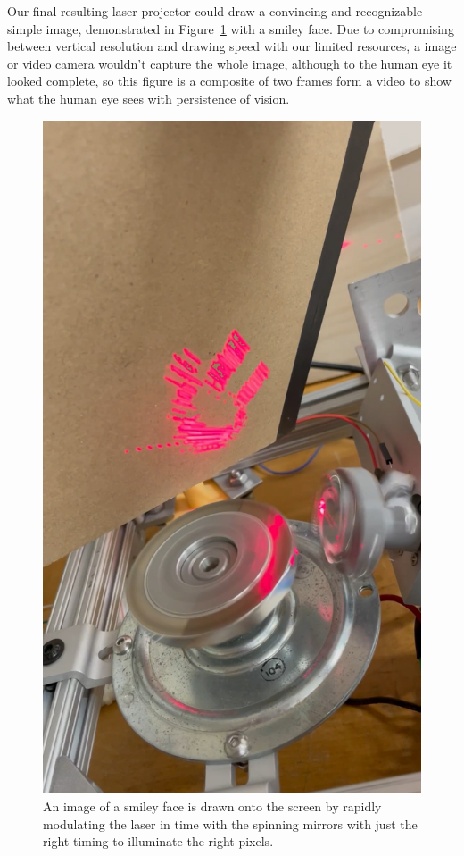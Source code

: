 \documentclass[twocolumn]{revtex4-2}
\begin{document}
Our final resulting laser projector could draw a convincing and recognizable simple image, demonstrated in Figure~\ref{fig:smiley} with a smiley face. Due to compromising between vertical resolution and drawing speed with our limited resources, a image or video camera wouldn't capture the whole image, although to the human eye it looked complete, so this figure is a composite of two frames form a video to show what the human eye sees with persistence of vision. 

\begin{figure}[t]
    \centering
    \includegraphics[width=0.80\linewidth]{smile-composite.jpeg}
    \caption[Final Demo: Drawing a Smile]{An image of a smiley face is drawn onto the screen by rapidly modulating the laser in time with the spinning mirrors with just the right timing to illuminate the right pixels.}
    \label{fig:smiley}
\end{figure}
\end{document}
